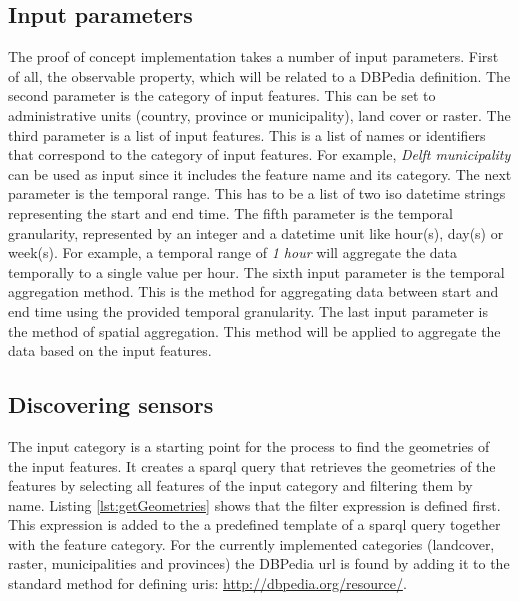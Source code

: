 \subsection{Input parameters}
The proof of concept implementation takes a number of input parameters. First of all, the observable property, which will be related to a DBPedia definition. The second parameter is the category of input features. This can be set to administrative units (country, province or municipality), land cover or raster. The third parameter is a list of input features. This is a list of names or identifiers that correspond to the category of input features. For example, \textit{Delft municipality} can be used as input since it includes the feature name and its category. The next parameter is the temporal range. This has to be a list of two \ac{iso} datetime strings representing the start and end time. The fifth parameter is the temporal granularity, represented by an integer and a datetime unit like hour(s), day(s) or week(s). For example, a temporal range of \textit{1 hour} will aggregate the data temporally to a single value per hour. The sixth input parameter is the temporal aggregation method. This is the method for aggregating data between start and end time using the provided temporal granularity. The last input parameter is the method of spatial aggregation. This method will be applied to aggregate the data based on the input features.       

\subsection{Discovering sensors}
\label{par:discoverSensors}
The input category is a starting point for the process to find the geometries of the input features. It creates a \ac{sparql} query that retrieves the geometries of the features by selecting all features of the input category and filtering them by name. Listing \ref{lst:getGeometries} shows that the filter expression is defined first. This expression is added to the a predefined template of a \ac{sparql} query together with the feature category. For the currently implemented categories (landcover, raster, municipalities and provinces) the DBPedia \ac{url} is found by adding it to the standard method for defining \acp{uri}: \url{http://dbpedia.org/resource/}.    

